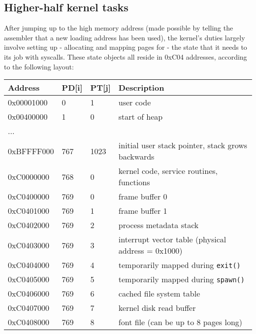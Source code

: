 \documentclass[12pt,a4paper]{report}
\begin{document}
\subsection*{Higher-half kernel tasks}

After jumping up to the high memory address (made possible by telling the assembler that a new loading address has been used), the kernel's duties largely involve setting up - allocating and mapping pages for - the state that it needs to its job with syscalls. These state objects all reside in 0xC04 addresses, according to the following layout:

\begin{center}
  \begin{tabular}{|l|l|l|l|}
    \hline
    Address    & PD[i] & PT[j] & Description                                         \\
    \hline
    0x00001000 & 0     & 1     & user code                                           \\
    0x00400000 & 1     & 0     & start of heap                                       \\
    ...        &       &       &                                                     \\
    0xBFFFF000 & 767   & 1023  & initial user stack pointer, stack grows backwards   \\
    \hline
    0xC0000000 & 768   & 0     & kernel code, service routines, functions            \\
    0xC0400000 & 769   & 0     & frame buffer 0                                      \\
    0xC0401000 & 769   & 1     & frame buffer 1                                      \\
    0xC0402000 & 769   & 2     & process metadata stack                              \\
    0xC0403000 & 769   & 3     & interrupt vector table (physical address = 0x1000)  \\
    0xC0404000 & 769   & 4     & temporarily mapped during \texttt{exit()}           \\
    0xC0405000 & 769   & 5     & temporarily mapped during \texttt{spawn()}          \\
    0xC0406000 & 769   & 6     & cached file system table                            \\
    0xC0407000 & 769   & 7     & kernel disk read buffer                             \\
    0xC0408000 & 769   & 8     & font file (can be up to 8 pages long)               \\

\end{tabular}
\end{center}
\end{document}
